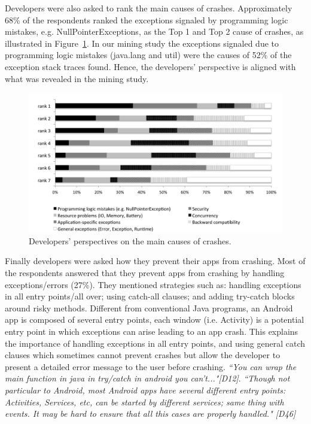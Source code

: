 
Developers were also asked to rank the main causes of crashes. Approximately 68\% of the respondents ranked the exceptions signaled by programming logic mistakes, e.g. NullPointerExceptions, as the Top 1 and Top 2 cause of crashes, as illustrated in Figure~\ref{fig:ranking}. In our mining study the exceptions signaled due to programming logic mistakes (java.lang and util) were the causes of 52\% of the exception stack traces found. Hence, the developers' perspective is aligned with what was revealed in the mining study.
\begin{figure}
\centering \includegraphics[scale=0.60]{ranking.png}
\caption{Developers' perspectives on the main causes of crashes.}\label{fig:ranking}
\end{figure}

Finally developers were asked how they prevent their apps from crashing. Most of the respondents answered that they prevent apps from crashing by handling exceptions/errors (27\%). They mentioned strategies such as: handling exceptions in all entry points/all over; using catch-all clauses; and adding try-catch blocks around risky methods. Different from conventional Java programs, an Android app is composed of several entry points, each window (i.e. Activity) is a potential entry point in which exceptions can arise leading to an app crash. This explains the importance of handling exceptions in all entry points, and using general catch clauses which sometimes cannot prevent crashes but allow the developer to present a detailed error message to the user before crashing.  \emph{``You can wrap the main function in java in try/catch in android you can't..."[D12]}. \emph{``Though not particular to Android, most Android apps have several different entry points: Activities, Services, etc, can be started by different services; same thing with events. It may be hard to ensure that all this cases are properly handled." [D46]}

